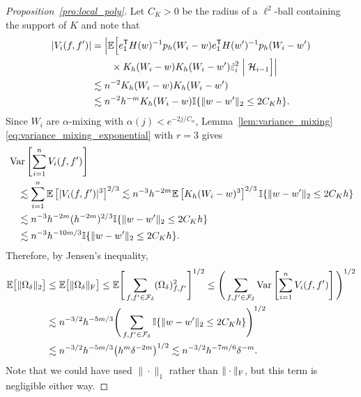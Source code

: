 \begin{proof}[Proposition~\ref{pro:local_poly}]
  Let $C_K>0$ be the radius of a $\ell^2$-ball
  containing the support of $K$
  and note that
  \begin{align*}
    \left|
    V_i(f,f')
    \right|
    &=
    \Big|
    \mathbb{E}\Big[
      e_1^{\mathsf{T}} H(w)^{-1}
      p_h(W_i-w)
      e_1^{\mathsf{T}} H(w')^{-1}
      p_h(W_i-w') \\
      &\qquad\times
      K_h(W_i-w)
      K_h(W_i-w')
      \tilde\varepsilon_i^2
      \Bigm| \mathcal{H}_{i-1}
    \Big]
    \Big| \\
    &\lesssim
    n^{-2}
    K_h(W_i-w)
    K_h(W_i-w') \\
    &\lesssim
    n^{-2}
    h^{-m}
    K_h(W_i-w)
    \mathbb{I}\{\|w-w'\|_2 \leq 2 C_K h\}.
  \end{align*}
  Since $W_i$ are $\alpha$-mixing
  with $\alpha(j) < e^{-2j / C_\alpha}$,
  Lemma~\ref{lem:variance_mixing}\ref{eq:variance_mixing_exponential}
  with $r=3$ gives
  \begin{align*}
    &\operatorname{Var}\left[
      \sum_{i=1}^n V_i(f,f')
    \right] \\
    &\quad\lesssim
    \sum_{i=1}^n
    \mathbb{E}\left[
      |V_i(f,f')|^3
    \right] ^{2/3}
    \lesssim
    n^{-3} h^{-2m}
    \mathbb{E}\left[
      K_h(W_i-w)^3
    \right] ^{2/3}
    \mathbb{I}\{\|w-w'\|_2 \leq 2 C_K h\} \\
    &\quad\lesssim
    n^{-3} h^{-2m}
    (h^{-2m})^{2/3}
    \mathbb{I}\{\|w-w'\|_2 \leq 2 C_K h\} \\
    &\quad\lesssim
    n^{-3} h^{-10m/3}
    \mathbb{I}\{\|w-w'\|_2 \leq 2 C_K h\}.
  \end{align*}
  Therefore, by Jensen's inequality,
  \begin{align*}
    \mathbb{E}\big[ \|\Omega_\delta\|_2 \big]
    &\leq
    \mathbb{E}\big[ \|\Omega_\delta\|_{\mathrm{F}} \big]
    \leq
    \mathbb{E}\Bigg[
      \sum_{f,f' \in \mathcal{F}_\delta}
      (\Omega_\delta)_{f,f'}^2
    \Bigg]^{1/2}
    \leq
    \Bigg(
      \sum_{f,f' \in \mathcal{F}_\delta}
      \operatorname{Var}\left[
        \sum_{i=1}^n V_i(f,f')
      \right]
    \Bigg)^{1/2} \\
    &\lesssim
    n^{-3/2} h^{-5m/3}
    \Bigg(
      \sum_{f,f' \in \mathcal{F}_\delta}
      \mathbb{I}\{\|w-w'\|_2 \leq 2 C_K h\}
    \Bigg)^{1/2} \\
    &\lesssim
    n^{-3/2} h^{-5m/3}
    \big(h^{m} \delta^{-2m} \big)^{1/2}
    \lesssim
    n^{-3/2}
    h^{-7m/6}
    \delta^{-m}.
  \end{align*}
  Note that we could have used
  $\|\cdot\|_1$ rather than $\|\cdot\|_{\mathrm{F}}$,
  but this term is negligible either way.



\end{proof}
